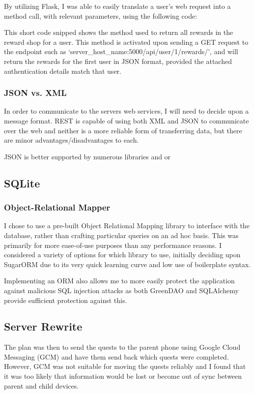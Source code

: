 By utilizing Flask, I was able to easily translate a user's web request into a method call, with relevant parameters, using the following code:

This short code snipped shows the method used to return all rewards in the reward shop for a user.
This method is activated upon sending a GET request to the endpoint such as `server\_host\_name:5000/api/user/1/rewards/', and will return the rewards for the first user in JSON format, provided the attached authentication details match that user. 

\subsubsection{JSON vs. XML}
In order to communicate to the servers web services, I will need to decide upon a message format. 
REST is capable of using both XML and JSON to communicate over the web and neither is a more reliable form of transferring data, but there are minor advantages/disadvantages to each.

JSON is better supported by numerous libraries and or



\subsection{SQLite}
\subsubsection{Object-Relational Mapper}
I chose to use a pre-built Object Relational Mapping library to interface with the database, rather than crafting particular queries on an ad hoc basis. 
This was primarily for more ease-of-use purposes than any performance reasons. 
I considered a variety of options for which library to use, initially deciding upon SugarORM due to its very quick learning curve and low use of boilerplate syntax. 


Implementing an ORM also allows me to more easily protect the application against malicious SQL injection attacks as both GreenDAO and SQLAlchemy provide sufficient protection against this. 





\subsection{Server Rewrite}
The plan was then to send the quests to the parent phone using Google Cloud Messaging (GCM) and have them send back which quests were completed.
However, GCM was not suitable for moving the quests reliably and I found that it was too likely that information would be lost or become out of sync between parent and child devices.

